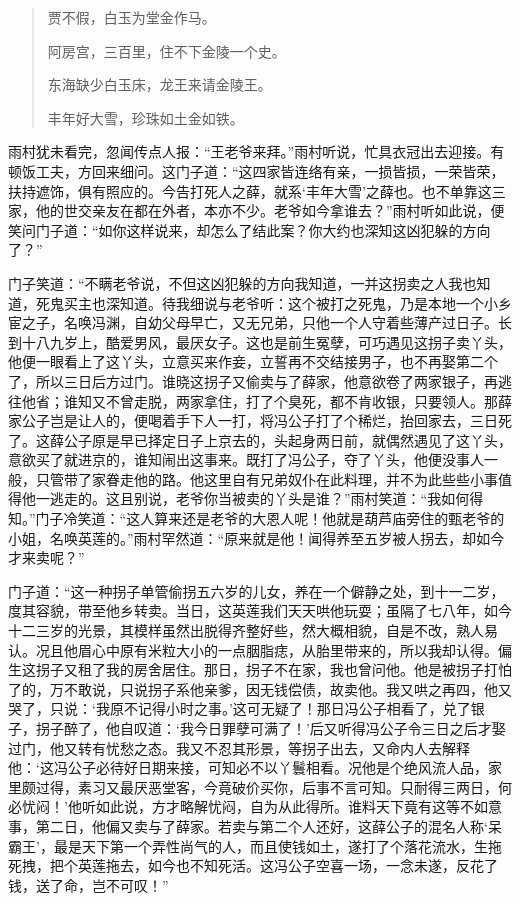 \documentclass[12pt,oneside]{book}
\newenvironment{shici}{%
\begin{verse}%
\centering\large\hspace{12pt}}%
{\end{verse}}
\begin{document}
\begin{shici}
贾不假，白玉为堂金作马。

阿房宫，三百里，住不下金陵一个史。

东海缺少白玉床，龙王来请金陵王。

丰年好大雪，珍珠如土金如铁。
\end{shici}


雨村犹未看完，忽闻传点人报：“王老爷来拜。”雨村听说，忙具衣冠出去迎接。有顿饭工夫，方回来细问。这门子道：“这四家皆连络有亲，一损皆损，一荣皆荣，扶持遮饰，俱有照应的。今告打死人之薛，就系‘丰年大雪’之薛也。也不单靠这三家，他的世交亲友在都在外者，本亦不少。老爷如今拿谁去？”雨村听如此说，便笑问门子道：“如你这样说来，却怎么了结此案？你大约也深知这凶犯躲的方向了？”

门子笑道：“不瞒老爷说，不但这凶犯躲的方向我知道，一并这拐卖之人我也知道，死鬼买主也深知道。待我细说与老爷听：这个被打之死鬼，乃是本地一个小乡宦之子，名唤冯渊，自幼父母早亡，又无兄弟，只他一个人守着些薄产过日子。长到十八九岁上，酷爱男风，最厌女子。这也是前生冤孽，可巧遇见这拐子卖丫头，他便一眼看上了这丫头，立意买来作妾，立誓再不交结接男子，也不再娶第二个了，所以三日后方过门。谁晓这拐子又偷卖与了薛家，他意欲卷了两家银子，再逃往他省；谁知又不曾走脱，两家拿住，打了个臭死，都不肯收银，只要领人。那薛家公子岂是让人的，便喝着手下人一打，将冯公子打了个稀烂，抬回家去，三日死了。这薛公子原是早已择定日子上京去的，头起身两日前，就偶然遇见了这丫头，意欲买了就进京的，谁知闹出这事来。既打了冯公子，夺了丫头，他便没事人一般，只管带了家眷走他的路。他这里自有兄弟奴仆在此料理，并不为此些些小事值得他一逃走的。这且别说，老爷你当被卖的丫头是谁？”雨村笑道：“我如何得知。”门子冷笑道：“这人算来还是老爷的大恩人呢！他就是葫芦庙旁住的甄老爷的小姐，名唤英莲的。”雨村罕然道：“原来就是他！闻得养至五岁被人拐去，却如今才来卖呢？”

门子道：“这一种拐子单管偷拐五六岁的儿女，养在一个僻静之处，到十一二岁，度其容貌，带至他乡转卖。当日，这英莲我们天天哄他玩耍；虽隔了七八年，如今十二三岁的光景，其模样虽然出脱得齐整好些，然大概相貌，自是不改，熟人易认。况且他眉心中原有米粒大小的一点胭脂痣，从胎里带来的，所以我却认得。偏生这拐子又租了我的房舍居住。那日，拐子不在家，我也曾问他。他是被拐子打怕了的，万不敢说，只说拐子系他亲爹，因无钱偿债，故卖他。我又哄之再四，他又哭了，只说：‘我原不记得小时之事。’这可无疑了！那日冯公子相看了，兑了银子，拐子醉了，他自叹道：‘我今日罪孽可满了！’后又听得冯公子令三日之后才娶过门，他又转有忧愁之态。我又不忍其形景，等拐子出去，又命内人去解释他：‘这冯公子必待好日期来接，可知必不以丫鬟相看。况他是个绝风流人品，家里颇过得，素习又最厌恶堂客，今竟破价买你，后事不言可知。只耐得三两日，何必忧闷！’他听如此说，方才略解忧闷，自为从此得所。谁料天下竟有这等不如意事，第二日，他偏又卖与了薛家。若卖与第二个人还好，这薛公子的混名人称‘呆霸王’，最是天下第一个弄性尚气的人，而且使钱如土，遂打了个落花流水，生拖死拽，把个英莲拖去，如今也不知死活。这冯公子空喜一场，一念未遂，反花了钱，送了命，岂不可叹！”
\end{document}
